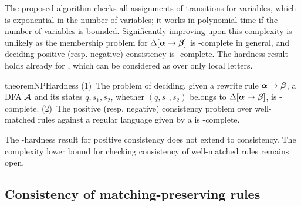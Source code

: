 The proposed algorithm checks all assignments of transitions for variables, which is exponential in the number of variables; it works in polynomial time if the number of variables is bounded. 
Significantly improving upon this complexity is unlikely as the membership problem for $\Delta[\boldsymbol{\alpha} \to \boldsymbol{\beta}]$ is \NP-complete in general, and 
deciding positive (resp. negative) consistency is \coNP-complete.
The hardness result holds already for \DFA, which can be considered as \DVPA over only local letters.


\begin{restatable}{theorem}{NPHardness}
(1)~The problem of deciding, given a rewrite rule $\boldsymbol{\alpha} \to \boldsymbol{\beta}$, a DFA $\mathcal{A}$ and its states $q, s_1, s_2$, whether $(q, s_1, s_2)$ belongs to $\Delta[\boldsymbol{\alpha} \to \boldsymbol{\beta}]$, is \NP-complete. 
(2)~The positive (resp. negative) consistency problem over well-matched rules against a regular language given by a \DFA is \coNP-complete.
\end{restatable}

The \coNP-hardness result for positive consistency does not extend to consistency.
The complexity lower bound for checking consistency  of well-matched rules remains open.

\subsection{Consistency of matching-preserving rules}
\label{s:matching-preserving}

